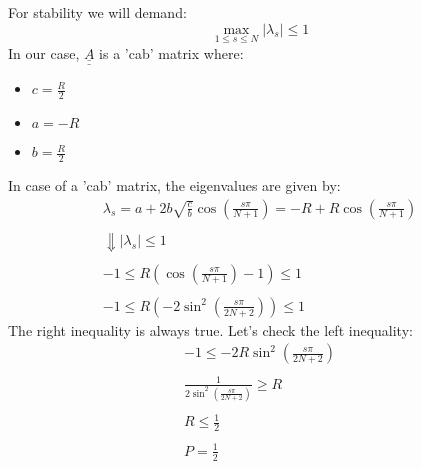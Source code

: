 \documentclass[11pt, a4paper]{article}
\begin{document}
For stability we will demand:
\begin{equation}
    \max_{1\le s\le N}{\left|\lambda_s\right|}\le1
\end{equation}
In our case, $\underline{\underline{A}}$ is a 'cab' matrix where:
\begin{multicols}{3}
    \begin{itemize}
        \item $c=\displaystyle\frac{R}{2}$
        \item $a=-R$
        \item $b=\displaystyle\frac{R}{2}$
    \end{itemize}
\end{multicols}
In case of a 'cab' matrix, the eigenvalues are given by:
\begin{equation}
    \begin{array}{c}
        \displaystyle\lambda_s=a+2b\sqrt{\frac{c}{b}}\cos\left(\frac{s\pi}{N+1}\right)=-R+R\cos\left(\frac{s\pi}{N+1}\right) \\\\
        \Downarrow \left|\lambda_s\right|\le1\\\\
        \displaystyle-1\le R\left(\cos\left(\frac{s\pi}{N+1}\right)-1\right)\le1 \\\\
        \displaystyle-1\le R\left(-2\sin^2\left(\frac{s\pi}{2N+2}\right)\right)\le1
    \end{array}
\end{equation}
The right inequality is always true. Let's check the left inequality:
\begin{equation}
    \begin{array}{c}
        \displaystyle -1\le -2R\sin^2\left(\frac{s\pi}{2N+2}\right) \\\\
        \displaystyle \frac{1}{\displaystyle2\sin^2\left(\frac{s\pi}{2N+2}\right)}\ge R \\\\
        \displaystyle R\le\frac{1}{2} \\\\
        \boxed{\displaystyle P=\frac{1}{2}}
    \end{array}
\end{equation}
\end{document}
